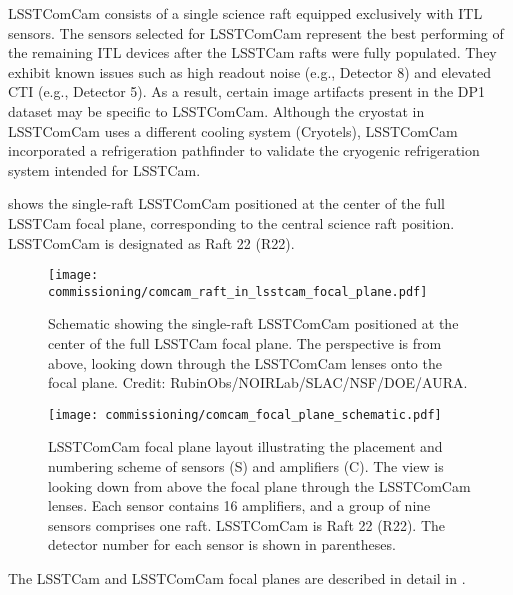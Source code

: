 LSSTComCam consists of a single science raft equipped exclusively with \gls{ITL} sensors.
The sensors selected for \gls{LSSTComCam} represent  the best performing of the remaining ITL devices after the LSSTCam rafts were fully populated. 
They  exhibit known issues such as high readout noise (e.g., Detector 8) and elevated \gls{CTI} (e.g., Detector 5).
As a result, certain image artifacts present in the \gls{DP1} dataset may be specific to LSSTComCam.
Although the cryostat in LSSTComCam uses a different cooling system (Cryotels), LSSTComCam incorporated a refrigeration pathfinder to validate the cryogenic refrigeration system intended for LSSTCam.

 shows the single-raft \gls{LSSTComCam} positioned at the center of the full LSSTCam focal plane, corresponding to the central science raft position.
\gls{LSSTComCam} is designated as Raft 22 (R22).
\begin{figure}[htb]
\centering
\texttt{[image: commissioning/comcam\_raft\_in\_lsstcam\_focal\_plane.pdf]}
\caption{Schematic showing the single-raft \gls{LSSTComCam} positioned at the center of the full LSSTCam focal plane. The perspective is from above, looking down through the \gls{LSSTComCam} lenses onto the focal plane. Credit: RubinObs/NOIRLab/SLAC/NSF/DOE/AURA.}
\label{fig:comcam_raft_in_lsstcam_focal_plane}
\vspace{0.1cm}
\end{figure}


\begin{figure}[htb!]
\centering
\texttt{[image: commissioning/comcam\_focal\_plane\_schematic.pdf]}
\caption{LSSTComCam focal plane layout illustrating the placement and numbering scheme of sensors (S) and amplifiers (C). The view is looking down from above the focal plane through the \gls{LSSTComCam} lenses. Each sensor contains 16 amplifiers, and a group of nine sensors comprises one raft. \gls{LSSTComCam} is Raft 22 (R22). The detector number for each sensor is shown in parentheses.}
\label{fig:comcam_focal_plane}
\vspace{0.1cm}
\end{figure}
The LSSTCam and \gls{LSSTComCam} focal planes are described in detail in \cite{ctn001}.


